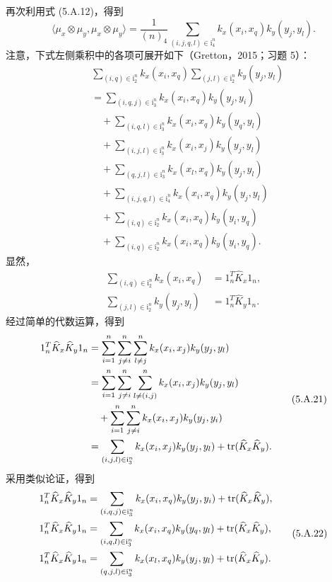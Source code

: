 再次利用式 (5.A.12)，得到
\begin{equation}
\langle\mu_x\otimes\mu_y,\mu_x\otimes\mu_y\rangle
=\frac1{(n)_4}\sum_{(i,j,q,l)\in\mathrm i_4^n}k_x(x_i,x_q)k_y(y_j,y_l).
\tag{5.A.18}
\end{equation}
注意，下式左侧乘积中的各项可展开如下（Gretton，2015；习题 5）：
\begin{equation}
\begin{aligned}
&\sum_{(i,q)\in\mathrm i_2^n}k_x(x_i,x_q)\sum_{(j,l)\in\mathrm i_2^n}k_y(y_j,y_l)\\
&=\sum_{(i,q,j)\in\mathrm i_3^n}k_x(x_i,x_q)k_y(y_j,y_i)\\
&\quad+\sum_{(i,q,l)\in\mathrm i_3^n}k_x(x_i,x_q)k_y(y_q,y_l)\\
&\quad+\sum_{(i,j,l)\in\mathrm i_3^n}k_x(x_i,x_j)k_y(y_j,y_l)\\
&\quad+\sum_{(q,j,l)\in\mathrm i_3^n}k_x(x_l,x_q)k_y(y_j,y_l)\\
&\quad+\sum_{(i,j,q,l)\in\mathrm i_4^n}k_x(x_i,x_q)k_y(y_j,y_l)\\
&\quad+\sum_{(i,q)\in\mathrm i_2^n}k_x(x_i,x_q)k_y(y_i,y_q)\\
&\quad+\sum_{(i,q)\in\mathrm i_2^n}k_x(x_i,x_q)k_y(y_i,y_q).
\end{aligned}
\tag{5.A.19}
\end{equation}
显然，
\begin{equation}
\begin{aligned}
\sum_{(i,q)\in\mathrm i_2^n}k_x(x_i,x_q)&=1_n^T\widehat K_x1_n,\\
\sum_{(j,l)\in\mathrm i_2^n}k_y(y_j,y_l)&=1_n^T\widehat K_y1_n.
\end{aligned}
\tag{5.A.20}
\end{equation}
经过简单的代数运算，得到
\begin{equation}
\begin{aligned}
1_n^T\widehat K_x\widehat K_y1_n
&=\sum_{i=1}^n\sum_{j\ne i}^n\sum_{l\ne j}^nk_x(x_i,x_j)k_y(y_j,y_l)\\
&=\sum_{i=1}^n\sum_{j\ne i}^n\sum_{l\ne(i,j)}^nk_x(x_i,x_j)k_y(y_j,y_l)\\
&\quad+\sum_{i=1}^n\sum_{j\ne i}^nk_x(x_i,x_j)k_y(y_j,y_i)\\
&=\sum_{(i,j,l)\in\mathrm i_3^n}k_x(x_i,x_j)k_y(y_j,y_l)+\operatorname{tr}(\widehat K_x\widehat K_y).
\end{aligned}
\tag{5.A.21}
\end{equation}
采用类似论证，得到
\begin{equation}
\begin{aligned}
1_n^T\widehat K_x\widehat K_y1_n
&=\sum_{(i,q,j)\in\mathrm i_3^n}k_x(x_i,x_q)k_y(y_j,y_i)+\operatorname{tr}(\widehat K_x\widehat K_y),\\
1_n^T\widehat K_x\widehat K_y1_n
&=\sum_{(i,q,l)\in\mathrm i_3^n}k_x(x_i,x_q)k_y(y_q,y_l)+\operatorname{tr}(\widehat K_x\widehat K_y),\\
1_n^T\widehat K_x\widehat K_y1_n
&=\sum_{(q,j,l)\in\mathrm i_3^n}k_x(x_l,x_q)k_y(y_j,y_l)+\operatorname{tr}(\widehat K_x\widehat K_y).
\end{aligned}
\tag{5.A.22}
\end{equation}
